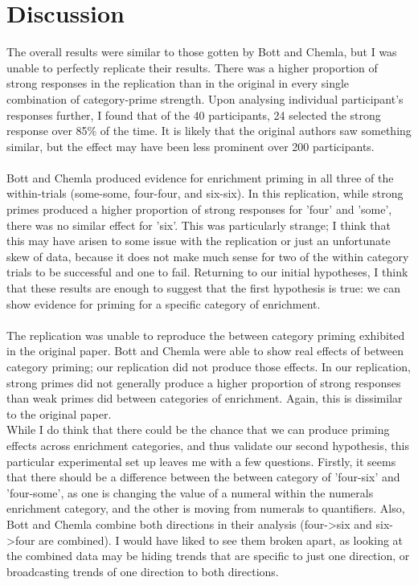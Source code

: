 \documentclass[]{article}
\begin{document}
\section*{Discussion}
The overall results were similar to those gotten by Bott and Chemla, but I was unable to perfectly replicate their results. There was a higher proportion of strong responses in the replication than in the original in every single combination of category-prime strength. Upon analysing individual participant's responses further, I found that of the 40 participants, 24 selected the strong response over 85\% of the time. It is likely that the original authors saw something similar, but the effect may have been less prominent over 200 participants.\\
\\
Bott and Chemla produced evidence for enrichment priming in all three of the within-trials (some-some, four-four, and six-six). In this replication, while strong primes produced a higher proportion of strong responses for 'four' and 'some', there was no similar effect for 'six'. This was particularly strange; I think that this may have arisen to some issue with the replication or just an unfortunate skew of data, because it does not make much sense for two of the within category trials to be successful and one to fail. Returning to our initial hypotheses, I think that these results are enough to suggest that the first hypothesis is true: we can show evidence for priming for a specific category of enrichment. \\
\\
The replication was unable to reproduce the between category priming exhibited in the original paper. Bott and Chemla were able to show real effects of between category priming; our replication did not produce those effects. In our replication, strong primes did not generally produce a higher proportion of strong responses than weak primes did between categories of enrichment. Again, this is dissimilar to the original paper. \\ 
While I do think that there could be the chance that we can produce priming effects across enrichment categories, and thus validate our second hypothesis, this particular experimental set up leaves me with a few questions. Firstly, it seems that there should be a difference between the between category of 'four-six' and 'four-some', as one is changing the value of a numeral within the numerals enrichment category, and the other is moving from numerals to quantifiers. Also, Bott and Chemla combine both directions in their analysis (four->six and six->four are combined). I would have liked to see them broken apart, as looking at the combined data may be hiding trends that are specific to just one direction, or broadcasting trends of one direction to both directions.\\
\end{document}
